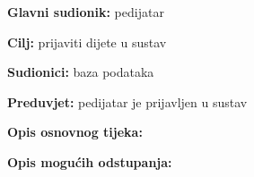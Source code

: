                     \noindent {}
					\begin{packed_item}
	
						\item \textbf{Glavni sudionik: }pedijatar
						\item  \textbf{Cilj:} prijaviti dijete u sustav
						\item  \textbf{Sudionici:} baza podataka
						\item  \textbf{Preduvjet:} pedijatar je prijavljen u sustav
						\item  \textbf{Opis osnovnog tijeka:}
						
						\item[] \begin{packed_enum}
	
							\item 
							\item 
							\item 

						\end{packed_enum}
						
						\item  \textbf{Opis mogućih odstupanja:}
						
						\item[] \begin{packed_item}
	
							\item[2.a] 
							\item[] \begin{packed_enum}
								
								\item 
								\item 
							\end{packed_enum}
							
						\end{packed_item}
					\end{packed_item}

